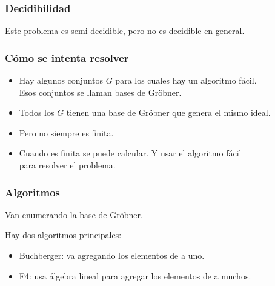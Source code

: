 \documentclass[spanish, aspectratio=169, hidecontrols]{beamer}
\begin{document}
\begin{frame}
  \frametitle{Decidibilidad}
  \pause
  Este problema es semi-decidible\pause, pero no es decidible en general.
\end{frame}

\begin{frame}
  \frametitle{Cómo se intenta resolver}
  \begin{itemize}
    \item Hay algunos conjuntos $G$ para los cuales hay un algoritmo fácil. \pause \\
    Esos conjuntos se llaman bases de Gröbner.
    \pause
    \item Todos los $G$ tienen una base de Gröbner que genera el mismo ideal.
    \pause
    \item Pero no siempre es finita.
    \pause
    \item Cuando es finita se puede calcular. \pause Y usar el algoritmo fácil \\ para resolver el problema.
  \end{itemize}
\end{frame}




\begin{frame}
  \frametitle{Algoritmos}

  Van enumerando la base de Gröbner.

  \pause
  Hay dos algoritmos principales:
  \begin{itemize}
    \item Buchberger: va agregando los elementos de a uno.
    \item F4: usa álgebra lineal para agregar los elementos de a muchos.
  \end{itemize}
\end{frame}
\end{document}
